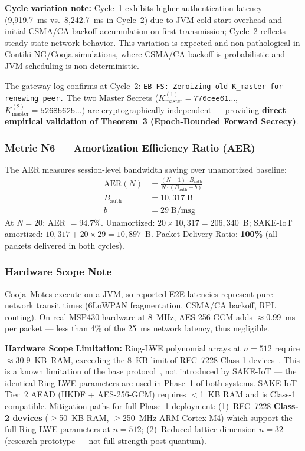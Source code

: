\documentclass[conference]{IEEEtran}
\newcommand{\Kmaster}{K_{\mathrm{master}}}
\begin{document}
\noindent\textbf{Cycle variation note:} Cycle~1 exhibits higher
authentication latency (9{,}919.7~ms vs.\ 8{,}242.7~ms in Cycle~2)
due to JVM cold-start overhead and initial CSMA/CA backoff
accumulation on first transmission; Cycle~2 reflects steady-state
network behavior. This variation is expected and non-pathological
in Contiki-NG/Cooja simulations, where CSMA/CA backoff is probabilistic
and JVM scheduling is non-deterministic.

The gateway log confirms at Cycle~2:
\texttt{EB-FS: Zeroizing old K\_master for renewing peer.}
The two Master Secrets
($\Kmaster^{(1)}\!=\!\texttt{776cee61{\ldots}}$,
$\Kmaster^{(2)}\!=\!\texttt{52685625{\ldots}}$) are
cryptographically independent --- providing \textbf{direct empirical
validation of Theorem~3 (Epoch-Bounded Forward Secrecy)}.

\subsubsection*{Metric N6 --- Amortization Efficiency Ratio (AER)}

The AER measures session-level bandwidth saving over unamortized baseline:
\begin{equation}
\begin{aligned}
\text{AER}(N) &= \frac{(N-1)\cdot B_{\text{auth}}}{N\cdot (B_{\text{auth}} + b)} \\
B_{\text{auth}} &= 10{,}317\;\text{B} \\
b &= 29\;\text{B/msg}
\end{aligned}
\label{eq:aer}
\end{equation}
At $N{=}20$: AER $= \mathbf{94.7\%}$. Unamortized:
$20 \times 10{,}317 = 206{,}340$~B; SAKE-IoT amortized:
$10{,}317 + 20 \times 29 = 10{,}897$~B.
Packet Delivery Ratio: \textbf{100\%} (all packets delivered in both cycles).

\subsubsection*{Hardware Scope Note}

Cooja~Motes execute on a JVM, so reported E2E latencies represent pure
network transit times (6LoWPAN fragmentation, CSMA/CA backoff, RPL
routing). On real MSP430 hardware at 8~MHz, AES-256-GCM adds
$\approx$0.99~ms per packet --- less than 4\% of the 25~ms network
latency, thus negligible.

\noindent\textbf{Hardware Scope Limitation:}
Ring-LWE polynomial arrays at $n{=}512$ require $\approx$30.9~KB~RAM,
exceeding the 8~KB limit of RFC~7228 Class-1 devices~\cite{rfc7228}.
This is a known limitation of the base protocol~\cite{kumari2022},
not introduced by SAKE-IoT --- the identical Ring-LWE parameters are
used in Phase~1 of both systems. SAKE-IoT Tier~2 AEAD
(HKDF + AES-256-GCM) requires $<$1~KB RAM and is Class-1 compatible.
Mitigation paths for full Phase~1 deployment:
(1)~RFC~7228 \textbf{Class-2 devices} ($\geq$50~KB RAM,
$\geq$250~MHz ARM Cortex-M4) which support the full Ring-LWE
parameters at $n{=}512$;
(2)~Reduced lattice dimension $n{=}32$ (research prototype --- not
full-strength post-quantum).
\end{document}
